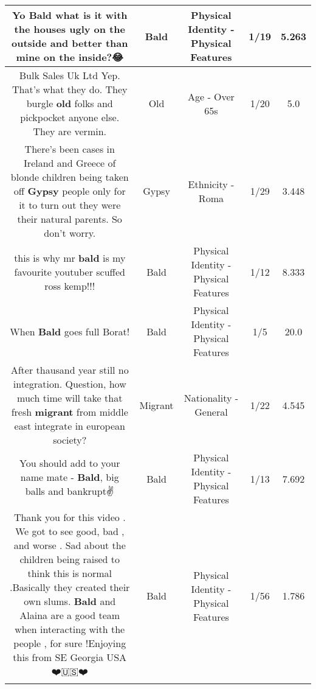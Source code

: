 \documentclass[11pt]{article}
\newlength\mylength
\begin{document}
\begin{center}
\begin{longtable}{|C{.65\mylength}|C{.30\mylength}|C{.12\mylength}|C{.12\mylength}|C{.12\mylength}|}
  \small Yo \textbf{Bald} what is it with the houses ugly on the outside and better than mine on the inside?😂\normalsize   & Bald & Physical Identity - Physical Features & 1/19 & 5.263 \\  \hline
  \small Bulk Sales Uk Ltd  Yep. That's what they do. They burgle \textbf{old} folks and pickpocket anyone else. They are vermin.\normalsize   & Old & Age - Over 65s & 1/20 & 5.0 \\  \hline
  \small There's been cases in Ireland and Greece of blonde children being taken off \textbf{Gypsy} people only for it to turn out they were their natural parents. So don't worry.\normalsize   & Gypsy & Ethnicity - Roma & 1/29 & 3.448 \\  \hline
  \small this is why mr \textbf{bald} is my favourite youtuber scuffed ross kemp!!!\normalsize   & Bald & Physical Identity - Physical Features & 1/12 & 8.333 \\  \hline
  \small When \textbf{Bald} goes full Borat!\normalsize   & Bald & Physical Identity - Physical Features & 1/5 & 20.0 \\  \hline
  \small After thausand year still no integration. Question, how much time will take that fresh \textbf{migrant} from middle east integrate in european society?\normalsize   & Migrant & Nationality - General & 1/22 & 4.545 \\  \hline
  \small You should add to your name mate - \textbf{Bald}, big balls and bankrupt✌️\normalsize   & Bald & Physical Identity - Physical Features & 1/13 & 7.692 \\  \hline
  \small Thank you for this video . We got to see good, bad , and worse . Sad about the children being raised to think this is normal .Basically they created their own slums. \textbf{Bald} and Alaina are a good team when interacting with the people , for sure !Enjoying this from SE Georgia USA ❤️🇺🇸❤️\normalsize   & Bald & Physical Identity - Physical Features & 1/56 & 1.786 \\  \hline

\end{longtable}
\end{center}
\end{document}
